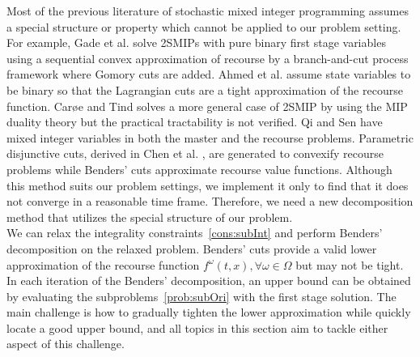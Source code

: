 \documentclass[11pt]{article}
\begin{document}
	Most of the previous literature of stochastic mixed integer programming assumes a special structure or property which cannot be applied to our problem setting. For example, Gade et al. \cite{gade2014decomposition} solve 2SMIPs with pure binary first stage variables using a sequential convex approximation of recourse by a branch-and-cut process framework where Gomory cuts are added. Ahmed et al. \cite{zou2016nested} assume state variables to be binary so that the Lagrangian cuts are a tight approximation of the recourse function. Car{\o}e and Tind \cite{caroe1998shaped} solves a more general case of 2SMIP by using the MIP duality theory but the practical tractability is not verified. Qi and Sen \cite{qi2017ancestral} have mixed integer variables in both the master and the recourse problems. Parametric disjunctive cuts, derived in Chen et al. \cite{chen2012computational}, are generated to convexify recourse problems while Benders' cuts approximate recourse value functions. Although this method suits our problem settings, we implement it only to find that it does not converge in a reasonable time frame. Therefore, we need a new decomposition method that utilizes the special structure of our problem. \\
	\newline
	We can relax the integrality constraints~\eqref{cons:subInt} and perform Benders' decomposition on the relaxed problem. Benders' cuts provide a valid lower approximation of the recourse function \(f^\omega(t,x), \forall \omega \in \Omega\) but may not be tight. In each iteration of the Benders' decomposition, an upper bound can be obtained by evaluating the subproblems~\eqref{prob:subOri} with the first stage solution. The main challenge is how to gradually tighten the lower approximation while quickly locate a good upper bound, and all topics in this section aim to tackle either aspect of this challenge.
\end{document}
